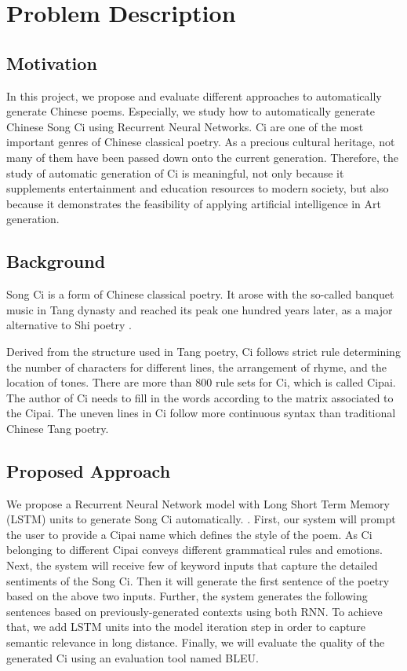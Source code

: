 \section{Problem Description}
\subsection{Motivation}  
%
In this project, we propose and evaluate different approaches to automatically generate Chinese poems. 
%
Especially, we study how to automatically generate Chinese Song Ci using Recurrent Neural Networks.
%
Ci are one of the most important genres of Chinese classical poetry. 
%
As a precious cultural heritage, not many of them have been passed down onto the current generation.
%
Therefore, the study of automatic generation of Ci is meaningful, not only because it supplements entertainment and education resources to modern society, but also because it demonstrates the feasibility of applying artificial intelligence in Art generation. 
%

\subsection{Background}
Song Ci is a form of Chinese classical poetry. It arose with the so-called banquet music in Tang dynasty and reached its peak one hundred years later, as a major alternative to Shi poetry\cite{cai2008chinesepoetry} .

Derived from the structure used in Tang poetry, Ci follows strict rule determining the number of characters for different lines, the arrangement of rhyme, and the location of tones. There are more than 800 rule sets for Ci, which is called Cipai\cite{wikici}. The author of Ci needs to fill in the words according to the matrix associated to the Cipai. The uneven lines in Ci follow more continuous syntax than traditional Chinese Tang poetry\cite{cai2008chinesepoetry}.

\subsection{Proposed Approach} 
%
We propose a Recurrent Neural Network model with Long Short Term Memory (LSTM) units to generate Song Ci automatically. .
%
First, our system will prompt the user to provide a Cipai name which defines the style of the poem.
%
As Ci belonging to different Cipai conveys different grammatical rules and emotions.
%
Next, the system will receive few of keyword inputs that capture the detailed sentiments of the Song Ci.
%
Then it will generate the first sentence of the poetry based on the above two inputs.
%
Further, the system generates the following sentences based on previously-generated contexts using both RNN. 
%
To achieve that, we add LSTM units into the model iteration step in order to capture semantic relevance in long distance. 
%
Finally, we will evaluate the quality of the generated Ci using an evaluation tool named BLEU.

